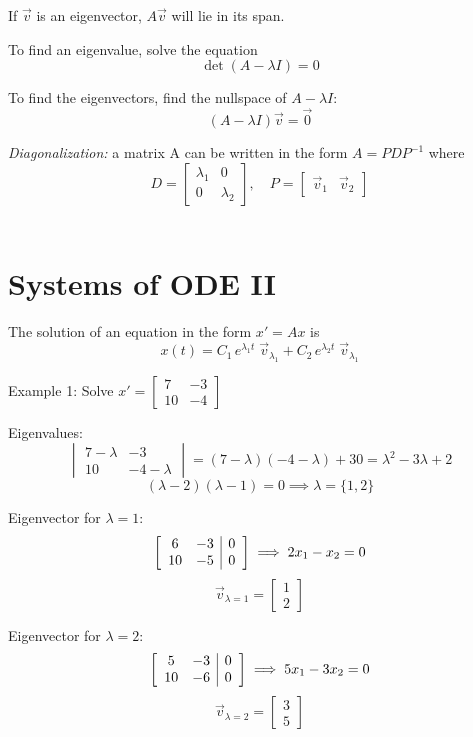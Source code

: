 \documentclass[12pt]{article}
\begin{document}
If $\vec{v}$ is an eigenvector, $A\vec{v}$ will lie in its span. 

To find an eigenvalue, solve the equation
\[\det (A - \lambda I) = 0\]

To find the eigenvectors, find the nullspace of $A - \lambda I$: 
\[(A - \lambda I)\vec{v} = \vec{0}\]

\emph{Diagonalization:} a matrix A can be written in the form $A = PDP^{-1}$ where
\[D = \begin{bmatrix}
    \lambda_1 & 0\\
    0 & \lambda_2
\end{bmatrix}, \quad P = \begin{bmatrix}
    \vec{v}_1 & \vec{v}_2
\end{bmatrix}\]\

\section{Systems of ODE II}
The solution of an equation in the form $x' = Ax$ is 
\[x(t) = C_1 \, e^{\lambda_1 t}\; \vec{v}_{\lambda_1} + C_2 \, e^{\lambda_2 t}\; \vec{v}_{\lambda_1}\]

Example 1: Solve $x' = \begin{bmatrix}
    7 & -3\\
    10 & -4
\end{bmatrix}$

Eigenvalues:
\[\begin{vmatrix}
    7 - \lambda & -3\\
    10 & -4 - \lambda
\end{vmatrix} = (7- \lambda)(-4-\lambda) +30 = \lambda^2 - 3\lambda + 2\]
\[(\lambda - 2)(\lambda - 1) = 0 \implies \lambda = \{1, 2\}\]

Eigenvector for $\lambda = 1$:
\[\left[\begin{array}{c c | c}
    6 & -3 & 0\\
    10 & -5 & 0
\end{array} \right]\implies 2x_1 - x_2 = 0\]
\[\vec{v}_{\lambda = 1} = \begin{bmatrix}
    1\\
    2
\end{bmatrix}\]

Eigenvector for $\lambda = 2$:
\[\left[\begin{array}{c c | c}
    5 & -3 & 0\\
    10 & -6 & 0
\end{array}\right] \implies 5x_1 - 3x_2 = 0\]
\[\vec{v}_{\lambda = 2} = \begin{bmatrix}
    3\\
    5
\end{bmatrix}\]
\end{document}
